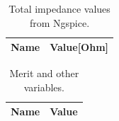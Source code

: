 \begin{table}[ht]
	\centering
	\begin{tabular}{|l|r|}
		\hline    
		{\bf Name} & {\bf Value[Ohm]} \\ \hline
    		
    		
	\end{tabular}
	
	\caption{Total impedance values from Ngspice.}
    
\label{tab:imp_sim}
\end{table}

\begin{table}[ht]
	\centering
	\begin{tabular}{|l|r|}
		\hline    
		{\bf Name} & {\bf Value} \\ \hline
    		
	\end{tabular}
	
	\caption{Merit and other variables.}
    
\label{tab:merit}
\end{table}


